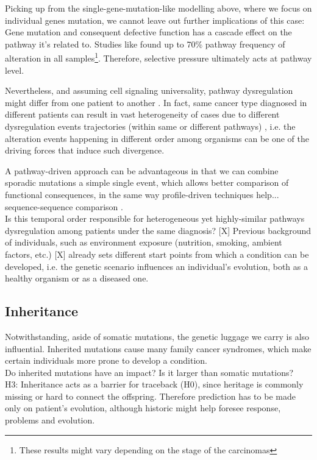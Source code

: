 Picking up from the single-gene-mutation-like modelling above, where we focus on individual genes mutation, we cannot leave out further implications of this case: Gene mutation and consequent defective function has a cascade effect on the pathway it's related to. Studies like \cite{Gerstung2011TheTumorigenesis} found up to 70\% pathway frequency of alteration in all samples\footnote{These results might vary depending on the stage of the carcinomas}. Therefore, selective pressure ultimately acts at pathway level.

Nevertheless, and assuming cell signaling universality, pathway dysregulation might differ from one patient to another \cite{Ulitsky2010DEGAS:Diseases}. In fact, same cancer type diagnosed in different patients can result in vast heterogeneity of cases due to different dysregulation events trajectories (within same or different pathways) \cite{Khakabimamaghani2019UncoveringDysregulation}, i.e. the alteration events happening in different order among organisms can be one of the driving forces that induce such divergence.

A pathway-driven approach can be advantageous in that we can combine sporadic mutations a simple single event, which allows better comparison of functional consequences, in the same way profile-driven techniques help... sequence-sequence comparison \cite{Cheng2012AGliomagenesis}.
\\

Is this temporal order responsible for heterogeneous yet highly-similar pathways dysregulation among patients under the same diagnosis? [X]
Previous background of individuals, such as environment exposure (nutrition, smoking, ambient factors, etc.) [X] already sets different start points from which a condition can be developed, i.e. the genetic scenario influences an individual’s evolution, both as a healthy organism or as a diseased one.
\\

\subsection{Inheritance}

Notwithstanding, aside of somatic mutations, the genetic luggage we carry is also influential. Inherited mutations cause many family cancer syndromes, which make certain individuals more prone to develop a condition.
\\

Do inherited mutations have an impact? Is it larger than somatic mutations?
\\

H3: Inheritance acts as a barrier for traceback (H0), since heritage is commonly missing or hard to connect the offspring. Therefore prediction has to be made only on patient’s evolution, although historic might help foresee response, problems and evolution.